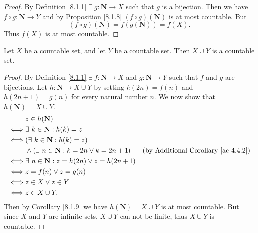 \begin{proof}
    By Definition \ref{8.1.1} \(\exists\ g : \mathbf{N} \to X\) such that \(g\) is a bijection.
    Then we have \(f \circ g : \mathbf{N} \to Y\) and by Proposition \ref{8.1.8} \((f \circ g)(\mathbf{N})\) is at most countable.
    But
    \[
        (f \circ g)(\mathbf{N}) = f(g(\mathbf{N})) = f(X).
    \]
    Thus \(f(X)\) is at most countable.
\end{proof}

\begin{proposition}\label{8.1.10}
    Let \(X\) be a countable set, and let \(Y\) be a countable set.
    Then \(X \cup Y\) is a countable set.
\end{proposition}

\begin{proof}
    By Definition \ref{8.1.1} \(\exists\ f : \mathbf{N} \to X\) and \(g : \mathbf{N} \to Y\) such that \(f\) and \(g\) are bijections.
    Let \(h : \mathbf{N} \to X \cup Y\) by setting \(h(2n) = f(n)\) and \(h(2n + 1) = g(n)\) for every natural number \(n\).
    We now show that \(h(\mathbf{N}) = X \cup Y\).
    \begin{align*}
             & z \in h(\mathbf{N})                                                                                          \\
        \iff & \exists\ k \in \mathbf{N} : h(k) = z                                                                         \\
        \iff & (\exists\ k \in \mathbf{N} : h(k) = z)                                                                       \\
             & \land (\exists\ n \in \mathbf{N} : k = 2n \lor k = 2n + 1) & \text{(by Additional Corollary \ref{ac 4.4.2})} \\
        \iff & \exists\ n \in \mathbf{N} : z = h(2n) \lor z = h(2n + 1)                                                     \\
        \iff & z = f(n) \lor z = g(n)                                                                                       \\
        \iff & z \in X \lor z \in Y                                                                                         \\
        \iff & z \in X \cup Y.
    \end{align*}
    Then by Corollary \ref{8.1.9} we have \(h(\mathbf{N}) = X \cup Y\) is at most countable.
    But since \(X\) and \(Y\) are infinite sets, \(X \cup Y\) can not be finite, thus \(X \cup Y\) is countable.
\end{proof}

